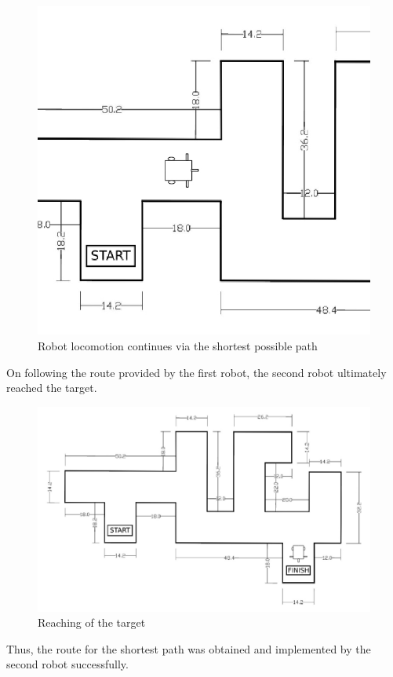\newpage
\begin{figure}[h]
\center
\includegraphics[scale=0.32]{part1_5new.jpg} 
\caption{Robot locomotion continues via the shortest possible path}
\end{figure}
\justify
On following the route provided by the first robot, the second robot ultimately reached the target.\\
\begin{figure}[h]
\center
\includegraphics[scale=0.25]{part1_6new.jpg} 
\caption{Reaching of the target}
\end{figure}
\justify Thus, the route for the shortest path was obtained and implemented by the second robot successfully.
